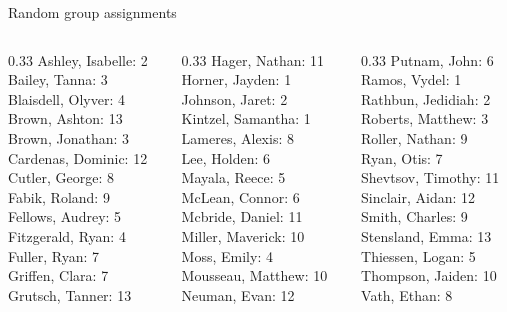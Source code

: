 \documentclass[10pt]{beamer}
\begin{document}
\begin{frame}{Random group assignments}
\begin{columns}
\begin{column}{0.33\textwidth}
Ashley, Isabelle: 2 \\ 
Bailey, Tanna: 3 \\ 
Blaisdell, Olyver: 4 \\ 
Brown, Ashton: 13 \\ 
Brown, Jonathan: 3 \\ 
Cardenas, Dominic: 12 \\ 
Cutler, George: 8 \\ 
Fabik, Roland: 9 \\ 
Fellows, Audrey: 5 \\ 
Fitzgerald, Ryan: 4 \\ 
Fuller, Ryan: 7 \\ 
Griffen, Clara: 7 \\ 
Grutsch, Tanner: 13 \\\end{column}
\begin{column}{0.33\textwidth}
Hager, Nathan: 11 \\ 
Horner, Jayden: 1 \\ 
Johnson, Jaret: 2 \\ 
Kintzel, Samantha: 1 \\ 
Lameres, Alexis: 8 \\ 
Lee, Holden: 6 \\ 
Mayala, Reece: 5 \\ 
McLean, Connor: 6 \\ 
Mcbride, Daniel: 11 \\ 
Miller, Maverick: 10 \\ 
Moss, Emily: 4 \\ 
Mousseau, Matthew: 10 \\ 
Neuman, Evan: 12 \\\end{column}
\begin{column}{0.33\textwidth}
Putnam, John: 6 \\ 
Ramos, Vydel: 1 \\ 
Rathbun, Jedidiah: 2 \\ 
Roberts, Matthew: 3 \\ 
Roller, Nathan: 9 \\ 
Ryan, Otis: 7 \\ 
Shevtsov, Timothy: 11 \\ 
Sinclair, Aidan: 12 \\ 
Smith, Charles: 9 \\ 
Stensland, Emma: 13 \\ 
Thiessen, Logan: 5 \\ 
Thompson, Jaiden: 10 \\ 
Vath, Ethan: 8 \\\end{column}
\end{columns}
\end{frame}
\end{document}
